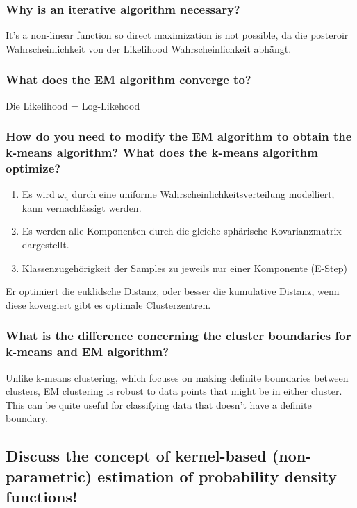 \documentclass[12pt]{scrartcl}
\begin{document}
\subsubsection{Why is an iterative algorithm necessary?}
It's a non-linear function so direct maximization is not possible, da die posteroir Wahrscheinlichkeit von der Likelihood Wahrscheinlichkeit abhängt.

\subsubsection{What does the EM algorithm converge to?}
Die Likelihood = Log-Likehood

\subsubsection{How do you need to modify the EM algorithm to obtain the k-means algorithm? What does the k-means algorithm optimize?}

\begin{enumerate}
\item Es wird $\omega_n$ durch eine uniforme Wahrscheinlichkeitsverteilung modelliert, kann vernachlässigt werden.
\item Es werden alle Komponenten durch die gleiche sphärische Kovarianzmatrix dargestellt.
\item Klassenzugehörigkeit der Samples zu jeweils nur einer Komponente (E-Step)
\end{enumerate}
Er optimiert die euklidsche Distanz, oder besser die kumulative Distanz, wenn diese kovergiert gibt es optimale Clusterzentren.

\subsubsection{What is the difference concerning the cluster boundaries for k-means and EM algorithm?}

Unlike k-means clustering, which focuses on making definite boundaries between clusters, EM clustering is robust to data points that might be in either cluster. This can be quite useful for classifying data that doesn't have a definite boundary.

\subsection{Discuss the concept of kernel-based (non-parametric) estimation of probability density functions!}
\end{document}
